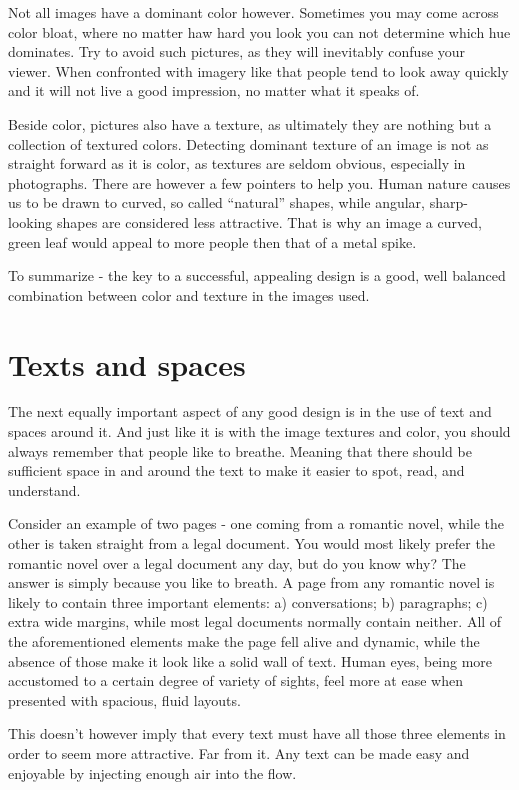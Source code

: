 Not all images have a dominant color however. Sometimes you may come across color bloat, where no matter haw hard you look you can not determine which hue dominates. Try to avoid such pictures, as they will inevitably confuse your viewer. When confronted with imagery like that people tend to look away quickly and it will not live a good impression, no matter what it speaks of.

Beside color, pictures also have a texture, as ultimately they are nothing but a collection of textured colors. Detecting dominant texture of an image is not as straight forward as it is color, as textures are seldom obvious, especially in photographs. There are however a few pointers to help you. Human nature causes us to be drawn to curved, so called “natural” shapes, while angular, sharp-looking shapes are considered less attractive. That is why an image a curved, green leaf would appeal to more people then that of a metal spike.

To summarize - the key to a successful, appealing design is a good, well balanced combination between color and texture in the images used.

\section*{Texts and spaces}

The next equally important aspect of any good design is in the use of text and spaces around it. And just like it is with the image textures and color, you should always remember that people like to breathe. Meaning that there should be sufficient space in and around the text to make it easier to spot, read, and understand.

Consider an example of two pages - one coming from a romantic novel, while the other is taken straight from a legal document. You would most likely prefer the romantic novel over a legal document any day, but do you know why? The answer is simply because you like to breath. A page from any romantic novel is likely to contain three important elements: a) conversations; b) paragraphs; c) extra wide margins, while most legal documents normally contain neither. All of the aforementioned elements make the page fell alive and dynamic, while the absence of those make it look like a solid wall of text. Human eyes, being more accustomed to a certain degree of variety of sights, feel more at ease when presented with spacious, fluid layouts.

This doesn’t however imply that every text must have all those three elements in order to seem more attractive. Far from it. Any text can be made easy and enjoyable by injecting enough air into the flow.

